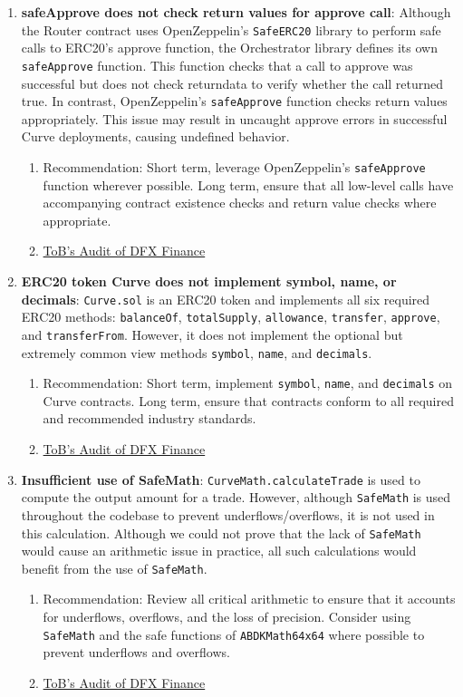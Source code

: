\begin{enumerate}
\item\textbf{safeApprove does not check return values for approve call}: Although the Router contract uses OpenZeppelin’s \verb|SafeERC20| library to perform safe calls to ERC20’s approve function, the Orchestrator library defines its own \verb|safeApprove| function. This function checks that a call to approve was successful but does not check returndata to verify whether the call returned true. In contrast, OpenZeppelin’s \verb|safeApprove| function checks return values appropriately. This issue may result in uncaught approve errors in successful Curve deployments, causing undefined behavior.
	\begin{enumerate}
	\item Recommendation: Short term, leverage OpenZeppelin’s \verb|safeApprove| function wherever possible. Long term, ensure that all low-level calls have accompanying contract existence checks and return value checks where appropriate.
	\item\href{https://github.com/dfx-finance/protocol/blob/main/audits/2021-05-03-Trail\_of\_Bits.pdf}{ToB's Audit of DFX Finance}
	\end{enumerate}

\item\textbf{ERC20 token Curve does not implement symbol, name, or decimals}: \verb|Curve.sol| is an ERC20 token and implements all six required ERC20 methods: \verb|balanceOf|, \verb|totalSupply|, \verb|allowance|, \verb|transfer|, \verb|approve|, and \verb|transferFrom|. However, it does not implement the optional but extremely common view methods \verb|symbol|, \verb|name|, and \verb|decimals|.
	\begin{enumerate}
	\item Recommendation: Short term, implement \verb|symbol|, \verb|name|, and \verb|decimals| on Curve contracts. Long term, ensure that contracts conform to all required and recommended industry standards.
	\item\href{https://github.com/dfx-finance/protocol/blob/main/audits/2021-05-03-Trail\_of\_Bits.pdf}{ToB's Audit of DFX Finance}
	\end{enumerate}

\item\textbf{Insufficient use of SafeMath}: \verb|CurveMath.calculateTrade| is used to compute the output amount for a trade. However, although \verb|SafeMath| is used throughout the codebase to prevent underflows/overflows, it is not used in this calculation. Although we could not prove that the lack of \verb|SafeMath| would cause an arithmetic issue in practice, all such calculations would benefit from the use of \verb|SafeMath|.
	\begin{enumerate}
	\item Recommendation: Review all critical arithmetic to ensure that it accounts for underflows, overflows, and the loss of precision. Consider using \verb|SafeMath| and the safe functions of \verb|ABDKMath64x64| where possible to prevent underflows and overflows.
	\item\href{https://github.com/dfx-finance/protocol/blob/main/audits/2021-05-03-Trail\_of\_Bits.pdf}{ToB's Audit of DFX Finance}
	\end{enumerate}


\end{enumerate}
